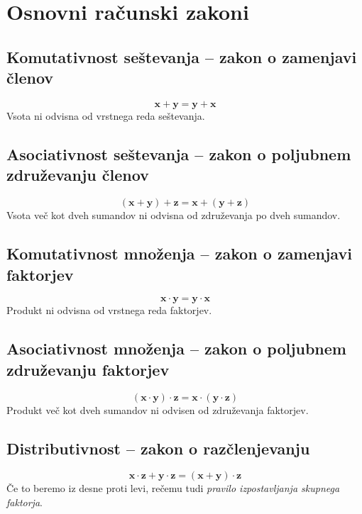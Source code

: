  
\newpage
 
     \section{Osnovni računski zakoni}

     \subsection*{Komutativnost seštevanja -- zakon o zamenjavi členov}
        $$ \mathbf{x+y=y+x}$$
        Vsota ni odvisna od vrstnega reda seštevanja.
     

        \subsection*{Asociativnost seštevanja -- zakon o poljubnem združevanju členov}
        $$ \mathbf{(x+y)+z=x+(y+z)}$$
        Vsota več kot dveh sumandov ni odvisna od združevanja po dveh sumandov.
     

        \subsection*{Komutativnost množenja -- zakon o zamenjavi faktorjev}
        $$ \mathbf{x\cdot y=y\cdot x}$$
        Produkt ni odvisna od vrstnega reda faktorjev.
     

        \subsection*{Asociativnost množenja -- zakon o poljubnem združevanju faktorjev}
        $$ \mathbf{(x\cdot y)\cdot z=x\cdot (y\cdot z)}$$
        Produkt več kot dveh sumandov ni odvisen od združevanja faktorjev.
     
        \subsection*{Distributivnost -- zakon o razčlenjevanju}
        $$ \mathbf{x\cdot z+y\cdot z = (x+y)\cdot z} $$
        Če to beremo iz desne proti levi, rečemu tudi \textit{pravilo izpostavljanja skupnega faktorja}.
        \newline ~
        \newline
 
